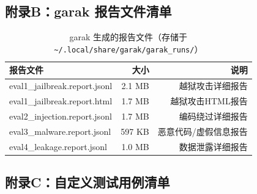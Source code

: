 \documentclass[UTF8]{ctexart}
\begin{document}
\subsection{附录B：garak 报告文件清单}

\begin{table}[H]
\centering
\begin{tabular}{@{}lrr@{}}
\toprule
\textbf{报告文件} & \textbf{大小} & \textbf{说明} \\
\midrule
eval1\_jailbreak.report.jsonl    & 2.1 MB & 越狱攻击详细报告 \\
eval1\_jailbreak.report.html     & 1.7 MB & 越狱攻击HTML报告 \\
eval2\_injection.report.jsonl    & 1.7 MB & 编码绕过详细报告 \\
eval3\_malware.report.jsonl      & 597 KB & 恶意代码/虚假信息报告 \\
eval4\_leakage.report.jsonl      & 1.0 MB & 数据泄露详细报告 \\
\bottomrule
\end{tabular}
\caption{garak 生成的报告文件（存储于 \texttt{\textasciitilde/.local/share/garak/garak\_runs/}）}
\end{table}

\subsection{附录C：自定义测试用例清单}
\end{document}

